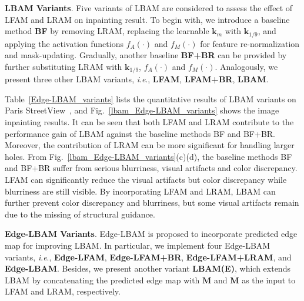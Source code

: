 \documentclass[10pt,journal,compsoc]{IEEEtran}
\newcommand{\ie}{\textit{i}.\textit{e}.}
\begin{document}
{\textbf{LBAM Variants}.} Five variants of LBAM are considered to assess the effect of LFAM and LRAM on inpainting result.
%
To begin with, we introduce a baseline method \textbf{BF} by removing LRAM, replacing the learnable $\mathbf{k}_{m}$ with $\mathbf{k}_{{1}/{9}}$, and applying the activation functions $f_A(\cdot)$ and $f_M(\cdot)$ for feature re-normalization and mask-updating.
%
Gradually, another baseline \textbf{BF+BR} can be provided by further substituting LRAM with $\mathbf{k}_{{1}/{9}}$, $f_A(\cdot)$ and $f_M(\cdot)$.
%
Analogously, we present three other LBAM variants, \ie, \textbf{LFAM}, \textbf{LFAM+BR}, \textbf{LBAM}.


%
%
Table~\ref{Edge-LBAM_variants} lists the quantitative results of LBAM variants on Paris StreetView~\cite{doersch2015makes}, and Fig.~\ref{lbam_Edge-LBAM_variants} shows the image inpainting results.
%
It can be seen that both LFAM and LRAM contribute to the performance gain of LBAM against the baseline methods {BF} and {BF+BR}.
%
Moreover, the contribution of LRAM can be more significant for handling larger holes.
%
From Fig.~\ref{lbam_Edge-LBAM_variants}(c)(d), the baseline methods {BF} and {BF+BR} suffer from serious blurriness, visual artifacts and color discrepancy.
%
LFAM can significantly reduce the visual artifacts but color discrepancy while blurriness are still visible.
%
By incorporating LFAM and LRAM, LBAM can further prevent color discrepancy and blurriness, but some visual artifacts remain due to the missing of structural guidance.

{\textbf{Edge-LBAM Variants}.} Edge-LBAM is proposed to incorporate predicted edge map for improving LBAM.
%
In particular, we implement four Edge-LBAM variants, \ie, \textbf{Edge-LFAM}, \textbf{Edge-LFAM+BR}, \textbf{Edge-LFAM+LRAM}, and \textbf{Edge-LBAM}.
%
Besides, we present another variant \textbf{LBAM(E)}, which extends LBAM by concatenating the predicted edge map with $\mathbf{M}$ and $\overline{\mathbf{M}}$ as the input to LFAM and LRAM, respectively.
\end{document}
